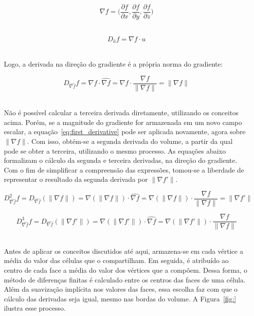 \begin{equation}\label{eq:grad}
	\nabla f = \bigg(\frac{\partial f}{\partial x}, \frac{\partial f}{\partial y}, \frac{\partial f}{\partial z}\bigg)
\end{equation} \

\begin{equation}\label{eq:ddir}
D_{\widehat{u}} f = \nabla f \cdot u
\end{equation} \

	Logo, a derivada na direção do gradiente é a própria norma do gradiente:

\begin{equation}\label{eq:first_derivative}
	D_{\widehat{\nabla f}} f = \nabla f \cdot \widehat{\nabla f} = \nabla f \cdot \frac{\nabla f}{\|\nabla f\|} = \|\nabla f\|
\end{equation} \

	Não é possível calcular a terceira derivada diretamente, utilizando os conceitos acima. Porém, se a magnitude do gradiente for armazenada em um novo campo escalar, a equação~\eqref{eq:first_derivative} pode ser aplicada novamente, agora sobre $ \|\nabla f\| $. Com isso, obtém-se a segunda derivada do volume, a partir da qual pode se obter a terceira, utilizando o mesmo processo. As equações abaixo formalizam o cálculo da segunda e terceira derivadas, na direção do gradiente. Com o fim de simplificar a compreensão das expressões, tomou-se a liberdade de representar o resultado da segunda derivada por $ \|\nabla f'\| $.
	
\begin{equation}\label{eq:second_derivative}
	D^{2}_{\widehat{\nabla f}} f = D_{\widehat{\nabla f}} (\|\nabla f\|) = \nabla (\|\nabla f\|) \cdot \widehat{\nabla f} = \nabla (\|\nabla f\|) \cdot \frac{\nabla f}{\|\nabla f\|} = \|\nabla f'\|
\end{equation}

\begin{equation}\label{eq:third_derivative}
	D^{3}_{\widehat{\nabla f}} f = D_{\widehat{\nabla f}} (\|\nabla f'\|) = \nabla (\|\nabla f'\|) \cdot \widehat{\nabla f} = \nabla (\|\nabla f'\|) \cdot \frac{\nabla f}{\|\nabla f\|}
\end{equation} \

	Antes de aplicar os conceitos discutidos até aqui, armazena-se em cada vértice a média do valor das células que o compartilham. Em seguida, é atribuído ao centro de cada face a média do valor dos vértices que a compõem. Dessa forma, o método de diferenças finitas é calculado entre os centros das faces de uma célula. Além da suavização implícita nos valores das faces, essa escolha faz com que o cálculo das derivadas seja igual, mesmo nas bordas do volume. A Figura~\ref{fig:} ilustra esse processo.
	

